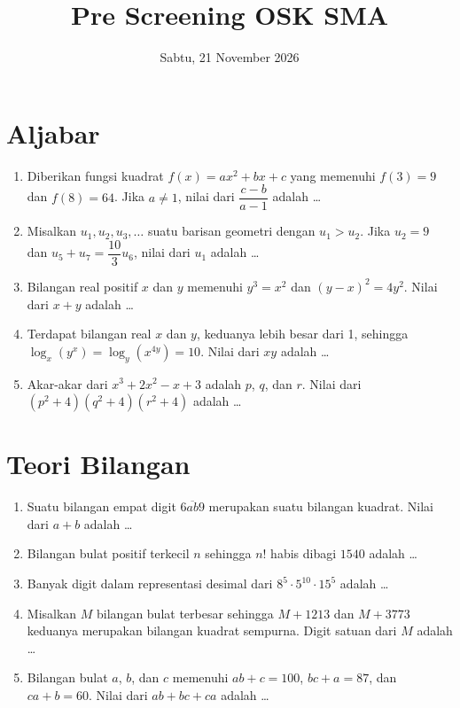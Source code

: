\documentclass[12pt]{scrartcl}
\title{Pre Screening OSK SMA}
\date{Sabtu, 21 November 2026}
\begin{document}
\section{Aljabar}
\begin{enumerate}
	\item Diberikan fungsi kuadrat $f(x)=ax^{2}+bx+c$ yang memenuhi $f(3)=9$ dan $f(8)=64$.
	Jika $a \ne 1$, nilai dari $\dfrac{c-b}{a-1}$ adalah \dots

	\item Misalkan $u_{1},u_{2},u_{3},\dots$ suatu barisan geometri dengan $u_{1}>u_{2}$.
	Jika $u_{2}=9$ dan $u_{5}+u_{7}=\dfrac{10}{3}u_{6}$, nilai dari $u_{1}$ adalah \dots

	\item Bilangan real positif $x$ dan $y$ memenuhi $y^{3}=x^{2}$ dan $(y-x)^{2}=4y^{2}$.
	Nilai dari $x+y$ adalah \dots

	\item Terdapat bilangan real $x$ dan $y$, keduanya lebih besar dari 1, sehingga
	$\log_{x}(y^{x})=\log_{y}(x^{4y})=10$. Nilai dari $xy$ adalah \dots

	\item Akar-akar dari $x^{3}+2x^{2}-x+3$ adalah $p$, $q$, dan $r$.
	Nilai dari $(p^{2}+4)(q^{2}+4)(r^{2}+4)$ adalah \dots
\end{enumerate}

\section{Teori Bilangan}
\begin{enumerate}[resume]
	\item Suatu bilangan empat digit $\overline{6ab9}$ merupakan suatu bilangan kuadrat.
	Nilai dari $a+b$ adalah \dots

	\item Bilangan bulat positif terkecil $n$ sehingga $n!$ habis dibagi $1540$ adalah \dots

	\item Banyak digit dalam representasi desimal dari $8^{5}\cdot 5^{10}\cdot 15^{5}$
	adalah \dots

	\item Misalkan $M$ bilangan bulat terbesar sehingga $M+1213$ dan $M+3773$
	keduanya merupakan bilangan kuadrat sempurna.
	Digit satuan dari $M$ adalah \dots

	\item Bilangan bulat $a$, $b$, dan $c$ memenuhi $ab+c=100$, $bc+a=87$,
	dan $ca+b=60$. Nilai dari $ab+bc+ca$ adalah \dots
\end{enumerate}
\end{document}
